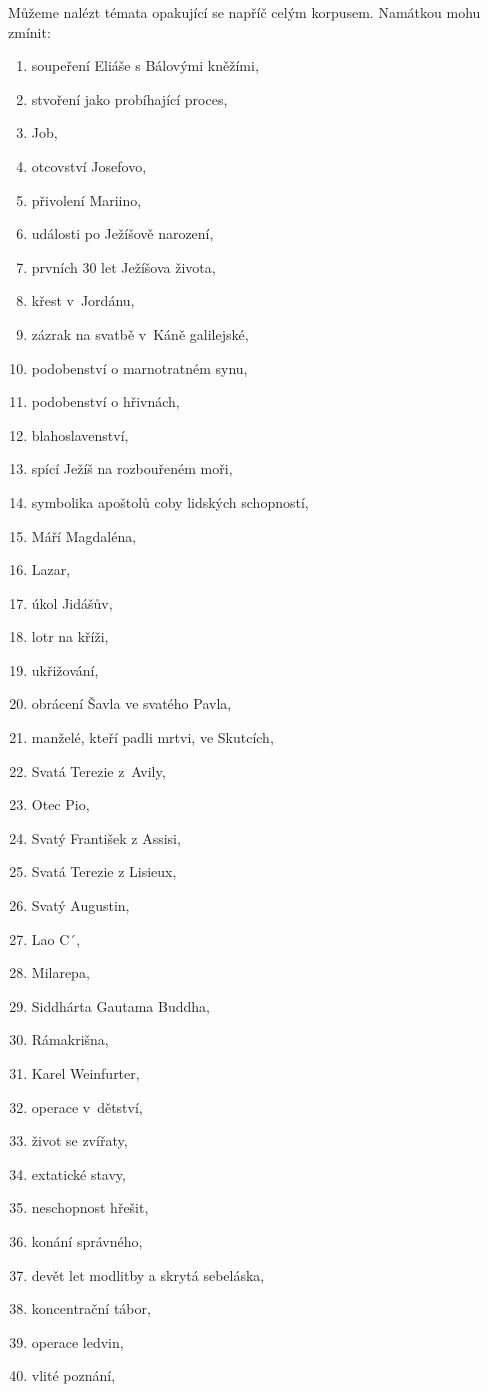 Můžeme nalézt témata opakující se napříč celým korpusem.
Namátkou mohu zmínit:

\begin{enumerate}
\item{soupeření Eliáše s Bálovými kněžími,}
\item{stvoření jako probíhající proces,}
\item{Job,}

\item{otcovství Josefovo,}
\item{přivolení Mariino,}
\item{události po Ježíšově narození,}
\item{prvních 30 let Ježíšova života,}
\item{křest v~Jordánu,}
\item{zázrak na svatbě v~Káně galilejské,}
\item{podobenství o marnotratném synu,}
\item{podobenství o hřivnách,}
\item{blahoslavenství,}
\item{spící Ježíš na rozbouřeném moři,}
\item{symbolika apoštolů coby lidských schopností,}
\item{Máří Magdaléna,}
\item{Lazar,}
\item{úkol Jidášův,}
\item{lotr na kříži,}
\item{ukřižování,}

\item{obrácení Šavla ve svatého Pavla,}
\item{manželé, kteří padli mrtvi, ve Skutcích,}

\item{Svatá Terezie z~Avily,}
\item{Otec Pio,}
\item{Svatý František z Assisi,}
\item{Svatá Terezie z Lisieux,}
\item{Svatý Augustin,}

\item{Lao C´,}
\item{Milarepa,}
\item{Siddhárta Gautama Buddha,}
\item{Rámakrišna,}
\item{Karel Weinfurter,}

\item{operace v~dětství,}
\item{život se zvířaty,}
\item{extatické stavy,}
\item{neschopnost hřešit,}
\item{konání správného,}
\item{devět let modlitby a skrytá sebeláska,}
\item{koncentrační tábor,}
\item{operace ledvin,}
\item{vlité poznání,}


\end{enumerate}
